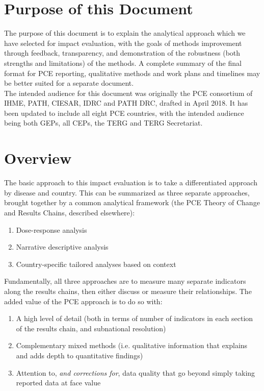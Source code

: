 \documentclass[twocolumn]{bmcart}%
\begin{document}

\section{Purpose of this Document}
The purpose of this document is to explain the analytical approach which we have selected for impact evaluation, with the goals of methods improvement through feedback, transparency, and demonstration of the robustness (both strengths and limitations) of the methods. A complete summary of the final format for PCE reporting, qualitative methods and work plans and timelines may be better suited for a separate document. \\

The intended audience for this document was originally the PCE consortium of IHME, PATH, CIESAR, IDRC and PATH DRC, drafted in April 2018. It has been updated to include all eight PCE countries, with the intended audience being both GEPs, all CEPs, the TERG and TERG Secretariat.

\section{Overview}
The basic approach to this impact evaluation is to take a differentiated approach by disease and country. This can be summarized as three separate approaches, brought together by a common analytical framework (the PCE Theory of Change and Results Chains, described elsewhere):

\begin{enumerate}
  \item Dose-response analysis
  \item Narrative descriptive analysis
  \item Country-specific tailored analyses based on context
\end{enumerate}
\smallskip

Fundamentally, all three approaches are to measure many separate indicators along the results chains, then either discuss or measure their relationships. The added value of the PCE approach is to do so with:
\begin{enumerate}
  \item A high level of detail (both in terms of number of indicators in each section of the results chain, and subnational resolution)
  \item Complementary mixed methods (i.e. qualitative information that explains and adds depth to quantitative findings)
  \item Attention to, \textit{and corrections for}, data quality that go beyond simply taking reported data at face value
\end{enumerate}
\smallskip
\end{document}
